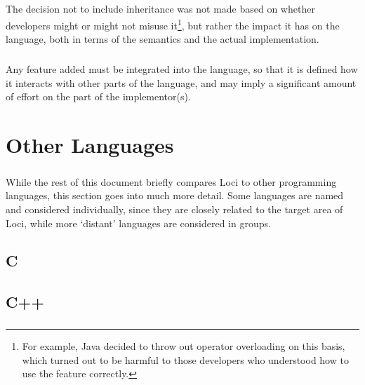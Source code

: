 \documentclass[12pt,twoside,notitlepage]{report}
\begin{document}
\paragraph{}
The decision not to include inheritance was not made based on whether developers might or might not misuse it\footnote{For example, Java decided to throw out operator overloading on this basis, which turned out to be harmful to those developers who understood how to use the feature correctly.}, but rather the impact it has on the language, both in terms of the semantics and the actual implementation.

\paragraph{}
Any feature added must be integrated into the language, so that it is defined how it interacts with other parts of the language, and may imply a significant amount of effort on the part of the implementor(s).

\cleardoublepage

\chapter{Other Languages}

\paragraph{}
While the rest of this document briefly compares Loci to other programming languages, this section goes into much more detail. Some languages are named and considered individually, since they are closely related to the target area of Loci, while more `distant' languages are considered in groups.

\section{C}

\paragraph{}


\section{C++}

\paragraph{}
\end{document}
